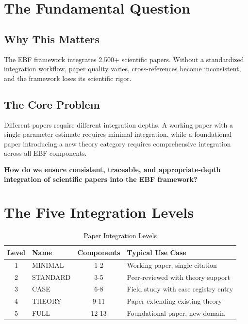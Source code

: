 \section{The Fundamental Question}
\label{sec:paperint-fundamental}

\subsection{Why This Matters}

The EBF framework integrates 2,500+ scientific papers. Without a standardized
integration workflow, paper quality varies, cross-references become inconsistent,
and the framework loses its scientific rigor.

\subsection{The Core Problem}

Different papers require different integration depths. A working paper with
a single parameter estimate requires minimal integration, while a foundational
paper introducing a new theory category requires comprehensive integration
across all EBF components.

\begin{tcolorbox}[colback=red!5!white, colframe=red!75!black,
    title=The Fundamental Question]
\textbf{How do we ensure consistent, traceable, and appropriate-depth integration
of scientific papers into the EBF framework?}
\end{tcolorbox}


\section{The Five Integration Levels}
\label{sec:paperint-levels}

\begin{table}[htbp]
\centering
\caption{Paper Integration Levels}
\label{tab:integration-levels}
\renewcommand{\arraystretch}{1.3}
\begin{tabular}{@{}clcl@{}}
\toprule
\textbf{Level} & \textbf{Name} & \textbf{Components} & \textbf{Typical Use Case} \\
\midrule
1 & MINIMAL & 1-2 & Working paper, single citation \\
2 & STANDARD & 3-5 & Peer-reviewed with theory support \\
3 & CASE & 6-8 & Field study with case registry entry \\
4 & THEORY & 9-11 & Paper extending existing theory \\
5 & FULL & 12-13 & Foundational paper, new domain \\
\bottomrule
\end{tabular}
\end{table}

